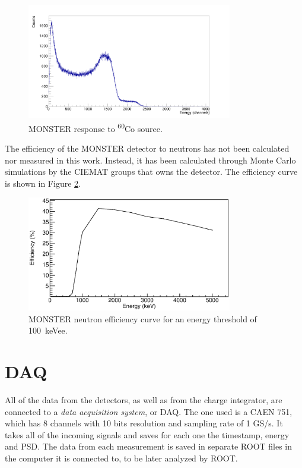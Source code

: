 \documentclass[a4paper,12pt]{report}
\begin{document}
\begin{figure}[H]
	\centering
	\includegraphics[width=0.80\textwidth]{monster_co_calibration.png}
	\caption{MONSTER response to \textsuperscript{60}Co source.}
	\label{monster_co_calibration}
\end{figure}

The efficiency of the MONSTER detector to neutrons has not been calculated nor measured in this work.
Instead, it has been calculated through Monte Carlo simulations by the CIEMAT groups that owns the detector.
The efficiency curve is shown in Figure \ref{monster_efficiency}.

\begin{figure}[H]
	\centering
	\includegraphics[width=0.80\textwidth]{monster_efficiency.eps}
	\caption{MONSTER neutron efficiency curve for an energy threshold of \qty{100}{keVee}.}
	\label{monster_efficiency}
\end{figure}

\section{DAQ}
All of the data from the detectors, as well as from the charge integrator, are connected to a \textit{data acquisition system}, or DAQ.
The one used is a CAEN 751, which has 8 channels with 10 bits resolution and sampling rate of 1 GS/s.\cite{CAEN}
It takes all of the incoming signals and saves for each one the timestamp, energy and PSD.
The data from each measurement is saved in separate ROOT files in the computer it is connected to, to be later analyzed by ROOT.\cite{ROOT}
\end{document}
